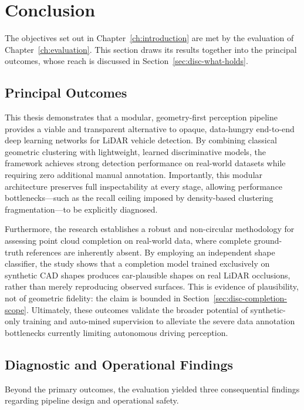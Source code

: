 \section{Conclusion}
\label{sec:conclusion-rqs}

The objectives set out in Chapter~\ref{ch:introduction} are met by the evaluation of
Chapter~\ref{ch:evaluation}. This section draws its results together into the principal
outcomes, whose reach is discussed in Section~\ref{sec:disc-what-holds}.

\subsection{Principal Outcomes}

This thesis demonstrates that a modular, geometry-first perception pipeline provides a viable and transparent alternative to opaque, data-hungry end-to-end deep learning networks for LiDAR vehicle detection. By combining classical geometric clustering with lightweight, learned discriminative models, the framework achieves strong detection performance on real-world datasets while requiring zero additional manual annotation. Importantly, this modular architecture preserves full inspectability at every stage, allowing performance bottlenecks—such as the recall ceiling imposed by density-based clustering fragmentation—to be explicitly diagnosed.

Furthermore, the research establishes a robust and non-circular methodology for assessing point cloud completion on real-world data, where complete ground-truth references are inherently absent. By employing an independent shape classifier, the study shows that a completion model trained exclusively on synthetic CAD shapes produces car-plausible shapes on real LiDAR occlusions, rather than merely reproducing observed surfaces. This is evidence of plausibility, not of geometric fidelity: the claim is bounded in Section~\ref{sec:disc-completion-scope}. Ultimately, these outcomes validate the broader potential of synthetic-only training and auto-mined supervision to alleviate the severe data annotation bottlenecks currently limiting autonomous driving perception.

\subsection{Diagnostic and Operational Findings}
\label{sec:completion-inferencebug}

Beyond the primary outcomes, the evaluation yielded three consequential findings
regarding pipeline design and operational safety.

